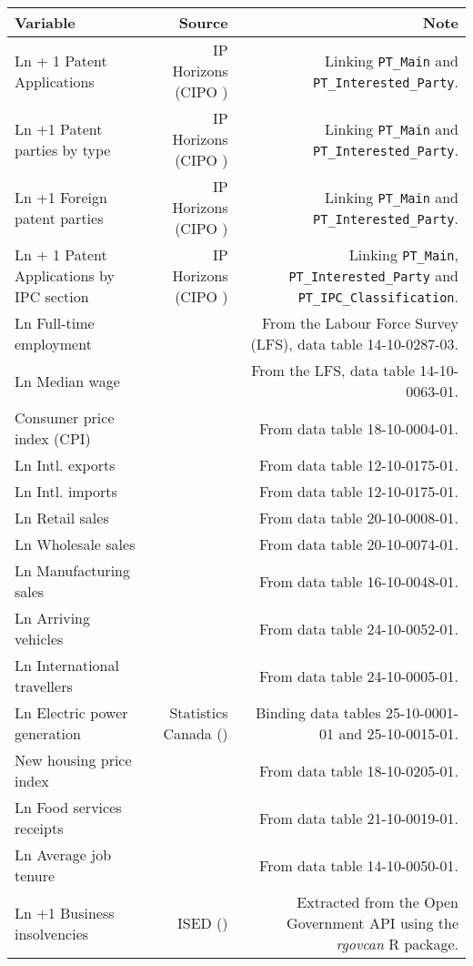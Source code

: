 \begin{tabular}[t]{lrr}
  \toprule
  Variable & Source & Note \\
  \midrule
  Ln + 1 Patent Applications & IP Horizons (CIPO \citeyear{canadianintellectualpropertyoffice23}) & Linking \texttt{PT\_Main} and \texttt{PT\_Interested\_Party}. \\
  Ln +1 Patent parties by type & IP Horizons (CIPO \citeyear{canadianintellectualpropertyoffice23}) & Linking \texttt{PT\_Main} and \texttt{PT\_Interested\_Party}. \\
  Ln +1 Foreign patent parties & IP Horizons (CIPO \citeyear{canadianintellectualpropertyoffice23}) & Linking \texttt{PT\_Main} and \texttt{PT\_Interested\_Party}. \\
  Ln + 1 Patent Applications by IPC section & IP Horizons (CIPO \citeyear{canadianintellectualpropertyoffice23}) & Linking \texttt{PT\_Main}, \texttt{PT\_Interested\_Party} and \texttt{PT\_IPC\_Classification}. \\
  Ln Full-time employment & \textcite{lfs_lfc_table} &  From the Labour Force Survey (LFS), data table 14-10-0287-03.\\
  Ln Median wage & \textcite{lfs_employee_wages} & From the LFS, data table 14-10-0063-01.\\
  Consumer price index (CPI) & \textcite{cpi}  & From data table 18-10-0004-01.\\
  Ln Intl. exports  & \textcite{statisticscanada24g} & From data table 12-10-0175-01. \\
  Ln Intl. imports & \textcite{statisticscanada24g} & From data table 12-10-0175-01. \\
  Ln Retail sales & \textcite{retail_trade_sales}& From data table 20-10-0008-01.\\
  Ln Wholesale sales & \textcite{wholesale_trade} & From data table 20-10-0074-01.\\
  Ln Manufacturing sales & \textcite{manufacturing_sales} & From data table 16-10-0048-01. \\
  Ln Arriving vehicles & \textcite{statisticscanada24d} & From data table 24-10-0052-01.\\
  Ln International travellers & \textcite{statisticscanada24e} & From data table 24-10-0005-01.\\
  Ln Electric power generation & Statistics Canada (\citeyear{statisticscanada08, statisticscanada24f}) & Binding data tables 25-10-0001-01 and 25-10-0015-01.\\
  New housing price index & \textcite{statisticscanada24a} & From data table 18-10-0205-01. \\
  Ln Food services receipts & \textcite{statisticscanada24c} & From data table 21-10-0019-01. \\
  Ln Average job tenure & \textcite{statisticscanada24b} & From data table 14-10-0050-01. \\
  Ln +1 Business insolvencies & ISED (\citeyear{insolvency24}) & Extracted from the Open Government API using the \textit{rgovcan} R package. \\
  \bottomrule
\end{tabular}
